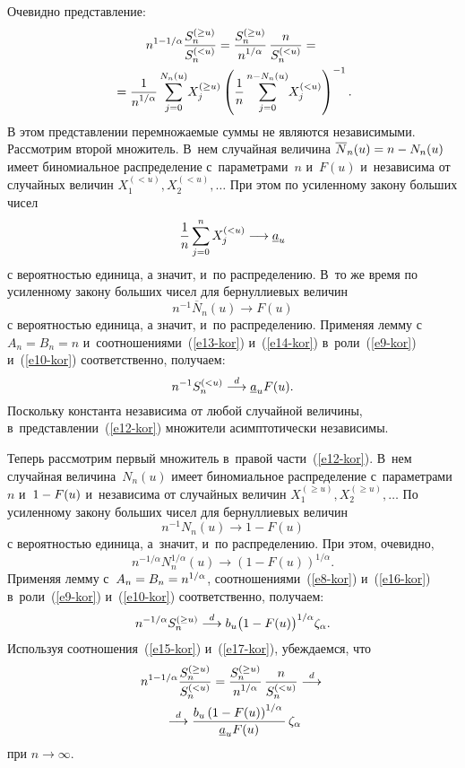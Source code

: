 \begin{multicols}{2}
Очевидно представление:
\begin{multline}
n^{1-1/\alpha}\displaystyle\frac{\displaystyle S_n^{(\ge u)}\mathstrut}{\displaystyle S_n^{(<u)}\mathstrut}=
\displaystyle\frac{\displaystyle S_n^{(\ge u)}\mathstrut}{\displaystyle n^{1/\alpha}\mathstrut}\,\displaystyle\frac{\displaystyle n\mathstrut}{\displaystyle S_n^{(<u)}\mathstrut}={}\\
{}=\displaystyle\frac{\displaystyle 1\mathstrut}{\displaystyle n^{1/\alpha}\mathstrut}\sum\limits_{j=0}^{N_n(u)}
\!X_j^{(\ge u)}\left(\displaystyle\frac{\displaystyle 1\mathstrut}{\displaystyle n\mathstrut}\sum\limits_{j=0}^{n-N_n(u)}\!X_j^{(<u)}
\right)^{-1}.\label{e12-kor}
\end{multline}
В этом представлении перемножаемые суммы не являются независимыми. 
Рассмотрим второй множитель. В~нем случайная величина 
$\overline{N}_n(u)\hm=n\hm-N_n(u)$ имеет биномиальное распределение 
с~параметрами~$n$ и~$F(u)$ и~независима от случайных величин 
$X_1^{(<u)},X_2^{(<u)},\ldots$ При этом по усиленному закону больших чисел
\begin{equation}
\displaystyle\frac{\displaystyle 1\mathstrut}{\displaystyle n\mathstrut}\sum\limits_{j=0}^{n}X_j^{(<u)}\longrightarrow \underline{a}_u
\label{e13-kor}
\end{equation}
с вероятностью единица, а значит, и~по распределению. 
В~то же время по усиленному закону больших чисел для бернуллиевых величин
\begin{equation}
n^{-1}\overline{N}_n(u)\longrightarrow F(u)\label{e14-kor}
\end{equation}
с вероятностью единица, а значит, и~по распределению. Применяя 
лемму с~$A_n=B_n=n$ и~соотношениями~(\ref{e13-kor}) и~(\ref{e14-kor}) 
в~роли~(\ref{e9-kor}) и~(\ref{e10-kor}) соответственно, получаем:
\begin{equation}
n^{-1}S_n^{(<u)}\stackrel{d}{\longrightarrow} \underline{a}_uF(u).\label{e15-kor}
\end{equation}
Поскольку константа независима от любой случайной величины, 
в~представлении~(\ref{e12-kor}) множители асимптотически независимы.

Теперь рассмотрим первый множитель в~правой части~(\ref{e12-kor}). 
В~нем случайная величина~$N_n(u)$ имеет биномиальное
 распределение с~параметрами~$n$ и~$1\hm-F(u)$ и~независима 
 от случайных величин $X_1^{(\ge u)},X_2^{(\ge u)},\ldots$ 
 По усиленному закону больших чисел для бернуллиевых величин
$$
n^{-1}N_n(u)\longrightarrow 1-F(u)
$$
с вероятностью единица, а~значит, и~по распределению. При этом, очевидно,
\begin{equation}
n^{-1/\alpha}N_n^{1/\alpha}(u)\longrightarrow 
\left(1-F(u)\right)^{1/\alpha}.
\label{e16-kor}
\end{equation}
Применяя лемму с~$A_n\hm=B_n\hm=n^{1/\alpha}$, соотношениями~(\ref{e8-kor}) 
и~(\ref{e16-kor}) в~роли~(\ref{e9-kor}) и~(\ref{e10-kor}) соответственно, получаем:
\begin{equation}
n^{-1/\alpha}S_n^{(\ge u)}\stackrel{d}{\longrightarrow} b_u\big(1-F(u)\big)^{1/\alpha}\zeta_{\alpha}.
\label{e17-kor}
\end{equation}
Используя соотношения~(\ref{e15-kor}) и~(\ref{e17-kor}), убеждаемся, что
\begin{multline*}
n^{1-1/\alpha}\displaystyle\frac{\displaystyle S_n^{(\ge u)}\mathstrut}{\displaystyle S_n^{(<u)}\mathstrut}=
\displaystyle\frac{\displaystyle S_n^{(\ge u)}\mathstrut}{\displaystyle n^{1/\alpha}\mathstrut}\,\displaystyle\frac{\displaystyle n\mathstrut}{\displaystyle S_n^{(<u)}\mathstrut}\stackrel{d}{\longrightarrow}{}\\
{}\stackrel{d}{\longrightarrow}
\displaystyle\frac{\displaystyle b_u\left(1-F(u)\right)^{1/\alpha}\mathstrut}{\displaystyle \underline{a}_uF(u)\mathstrut}\,\zeta_{\alpha}
\end{multline*}
при $n\to\infty$.


\end{multicols}
